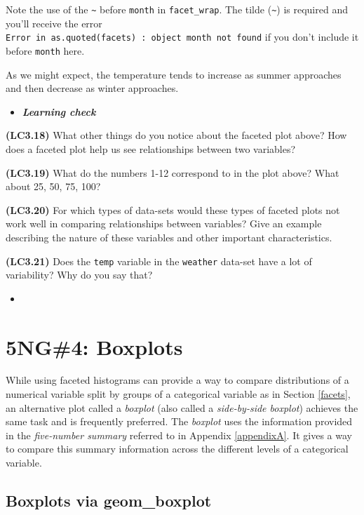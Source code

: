 \documentclass[12pt,]{krantz}
\newenvironment{rmdblock}[1]
  {\begin{shaded*}
  \begin{itemize}
  \renewcommand{\labelitemi}{
    \raisebox{-.7\height}[0pt][0pt]{
    }
  }
  \item
  }
  {
  \end{itemize}
  \end{shaded*}
  }
\newenvironment{learncheck}
  {\begin{rmdblock}{warning}}
  {\end{rmdblock}}
\theoremstyle{definition}
\theoremstyle{definition}
\theoremstyle{definition}
\theoremstyle{remark}
\begin{document}
Note the use of the \texttt{\textasciitilde{}} before \texttt{month} in
\texttt{facet\_wrap}. The tilde (\texttt{\textasciitilde{}}) is required
and you'll receive the error
\texttt{Error\ in\ as.quoted(facets)\ :\ object\ \textquotesingle{}month\textquotesingle{}\ not\ found}
if you don't include it before \texttt{month} here.

As we might expect, the temperature tends to increase as summer
approaches and then decrease as winter approaches.

\begin{learncheck}
\textbf{\emph{Learning check}}
\end{learncheck}

\textbf{(LC3.18)} What other things do you notice about the faceted plot
above? How does a faceted plot help us see relationships between two
variables?

\textbf{(LC3.19)} What do the numbers 1-12 correspond to in the plot
above? What about 25, 50, 75, 100?

\textbf{(LC3.20)} For which types of data-sets would these types of
faceted plots not work well in comparing relationships between
variables? Give an example describing the nature of these variables and
other important characteristics.

\textbf{(LC3.21)} Does the \texttt{temp} variable in the
\texttt{weather} data-set have a lot of variability? Why do you say
that?

\begin{learncheck}

\end{learncheck}

\section{5NG\#4: Boxplots}\label{boxplots}

While using faceted histograms can provide a way to compare
distributions of a numerical variable split by groups of a categorical
variable as in Section \ref{facets}, an alternative plot called a
\emph{boxplot} (also called a \emph{side-by-side boxplot}) achieves the
same task and is frequently preferred. The \emph{boxplot} uses the
information provided in the \emph{five-number summary} referred to in
Appendix \ref{appendixA}. It gives a way to compare this summary
information across the different levels of a categorical variable.

\subsection{Boxplots via geom\_boxplot}\label{geomboxplot}
\end{document}
